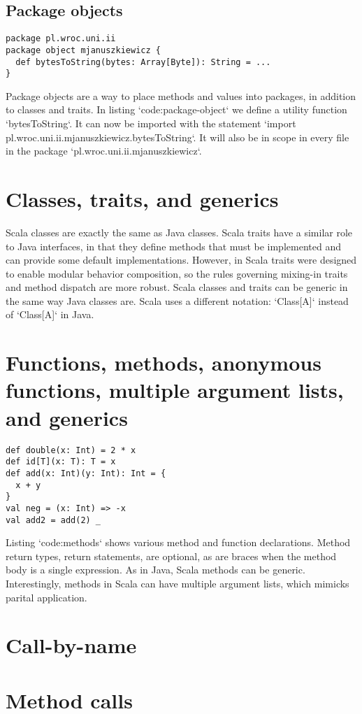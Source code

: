 \subsection{Package objects}

\begin{lstlisting}[caption=Package object, label=code:package-object, escapechar=|, float, floatplacement=H]
package pl.wroc.uni.ii
package object mjanuszkiewicz {
  def bytesToString(bytes: Array[Byte]): String = ...
}
\end{lstlisting}

Package objects are a way to place methods and values into packages, in addition to classes and traits.
In listing `code:package-object` we define a utility function `bytesToString`.
It can now be imported with the statement `import pl.wroc.uni.ii.mjanuszkiewicz.bytesToString`.
It will also be in scope in every file in the package `pl.wroc.uni.ii.mjanuszkiewicz`.

\section{Classes, traits, and generics}

Scala classes are exactly the same as Java classes.
Scala traits have a similar role to Java interfaces, in that they define methods that must be implemented and can provide some default implementations.
However, in Scala traits were designed to enable modular behavior composition, so the rules governing mixing-in traits and method dispatch are more robust.
Scala classes and traits can be generic in the same way Java classes are.
Scala uses a different notation: `Class[A]` instead of `Class[A]` in Java.

\section{Functions, methods, anonymous functions, multiple argument lists, and generics}

\begin{lstlisting}[caption=Methods and functions, label=code:methods, escapechar=|, float, floatplacement=H]
def double(x: Int) = 2 * x
def id[T](x: T): T = x
def add(x: Int)(y: Int): Int = {
  x + y
}
val neg = (x: Int) => -x
val add2 = add(2) _

\end{lstlisting}

Listing `code:methods` shows various method and function declarations.
Method return types, return statements, are optional, as are braces when the method body is a single expression.
As in Java, Scala methods can be generic.
Interestingly, methods in Scala can have multiple argument lists, which mimicks parital application.


\section{Call-by-name}

\section{Method calls}
